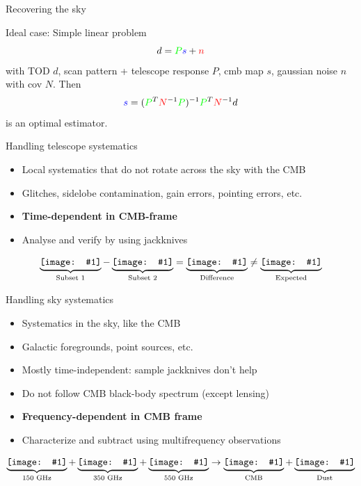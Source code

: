 \documentclass{beamer}
\newcommand*{\mimg}[2]{\begingroup
\setbox0=\hbox{\texttt{[image: \#1]}}\parbox{\wd0}{\box0}\endgroup}
\begin{document}
\begin{frame}{Recovering the sky}
	\begin{block}{Ideal case: Simple linear problem}
	\[ d = {\color{green}P}{\color{blue}s} + {\color{red}n} \]
	with TOD $d$,
	scan pattern + telescope response {\color{green} $P$},
	cmb map {\color{blue} $s$}, gaussian noise {\color{red} $n$} with cov {\color{red}$N$}.
	Then
	\[ {\color{blue}s} = ({\color{green}P}^T{\color{red}N}^{-1}{\color{green}P})^{-1}{\color{green}P}^T{\color{red}N}^{-1}d \]
	is an optimal estimator.
	\end{block}
\end{frame}

\begin{frame}{Handling telescope systematics}
	\begin{itemize}
		\item Local systematics that do not rotate across the sky with the CMB
		\item Glitches, sidelobe contamination, gain errors, pointing errors, etc.
		\item {\bf Time-dependent in CMB-frame}
		\item Analyse and verify by using jackknives
	\end{itemize}
	\[
		\underbrace{\mimg{out_dirty/null1_0.png}{2.0cm}}_{\textrm{Subset 1}} -
		\underbrace{\mimg{out_dirty/null1_1.png}{2.0cm}}_{\textrm{Subset 2}} =
		\underbrace{\mimg{out_dirty/null1_2.png}{2.0cm}}_{\textrm{Difference}} \ne
		\underbrace{\mimg{out_dirty/null1_3.png}{2.0cm}}_{\textrm{Expected}}
	\]
\end{frame}

\begin{frame}{Handling sky systematics}
	\begin{itemize}
		\item Systematics in the sky, like the CMB
		\item Galactic foregrounds, point sources, etc.
		\item Mostly time-independent: sample jackknives don't help
		\item Do not follow CMB black-body spectrum (except lensing)
		\item {\bf Frequency-dependent in CMB frame}
		\item Characterize and subtract using multifrequency observations
	\end{itemize}
	\[
		\underbrace{\mimg{out_dirty/null2_0.png}{1.8cm}}_{\textrm{150 GHz}} +
		\underbrace{\mimg{out_dirty/null2_1.png}{1.8cm}}_{\textrm{350 GHz}} +
		\underbrace{\mimg{out_dirty/null2_2.png}{1.8cm}}_{\textrm{550 GHz}} \rightarrow
		\underbrace{\mimg{out_dirty/null2_3.png}{1.8cm}}_{\textrm{CMB}} +
		\underbrace{\mimg{out_dirty/null2_4.png}{1.8cm}}_{\textrm{Dust}}
	\]
\end{frame}
\end{document}
